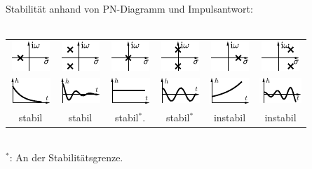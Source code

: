 \documentclass[fs, footer]{latex4ei}
\begin{document}
\begin{multicols*}{4}
{Stabilität anhand von PN-Diagramm und Impulsantwort:\\ \\
\setlength{\tabcolsep}{1mm}
\begin{tabular}{@{\extracolsep\fill}cccccc@{}} 
\includegraphics{./img/blocks/PN_1.pdf} & \includegraphics{./img/blocks/PN_2.pdf} & \includegraphics{./img/blocks/PN_3.pdf} & \includegraphics{./img/blocks/PN_4.pdf} & \includegraphics{./img/blocks/PN_5.pdf} & \includegraphics{./img/blocks/PN_6.pdf} \\
\includegraphics{./img/blocks/PN_1h.pdf} & \includegraphics{./img/blocks/PN_2h.pdf} & \includegraphics{./img/blocks/PN_3h.pdf} & \includegraphics{./img/blocks/PN_4h.pdf} & \includegraphics{./img/blocks/PN_5h.pdf} & \includegraphics{./img/blocks/PN_6h.pdf} \\
stabil & stabil & stabil$^*$. & stabil$^*$ & instabil & instabil\\
\end{tabular}\\
$^*$: An der Stabilitätsgrenze.\\

}
\end{multicols*}
\end{document}
